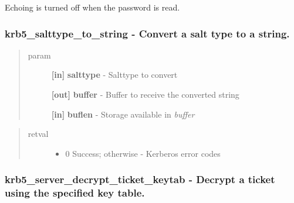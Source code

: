 \documentclass[letterpaper,10pt,english]{sphinxmanual}
\begin{document}
Echoing is turned off when the password is read.


\subsubsection{krb5\_salttype\_to\_string -  Convert a salt type to a string.}
\label{appdev/refs/api/krb5_salttype_to_string::doc}\label{appdev/refs/api/krb5_salttype_to_string:krb5-salttype-to-string-convert-a-salt-type-to-a-string}

\begin{fulllineitems}
\label{appdev/refs/api/krb5_salttype_to_string:krb5_salttype_to_string}
\end{fulllineitems}

\begin{quote}\begin{description}
\item[{param}] \leavevmode
\textbf{{[}in{]}} \textbf{salttype} - Salttype to convert

\textbf{{[}out{]}} \textbf{buffer} - Buffer to receive the converted string

\textbf{{[}in{]}} \textbf{buflen} - Storage available in \emph{buffer}

\end{description}\end{quote}
\begin{quote}\begin{description}
\item[{retval}] \leavevmode\begin{itemize}
\item {} 
0   Success; otherwise - Kerberos error codes

\end{itemize}

\end{description}\end{quote}


\subsubsection{krb5\_server\_decrypt\_ticket\_keytab -  Decrypt a ticket using the specified key table.}
\label{appdev/refs/api/krb5_server_decrypt_ticket_keytab:krb5-server-decrypt-ticket-keytab-decrypt-a-ticket-using-the-specified-key-table}\label{appdev/refs/api/krb5_server_decrypt_ticket_keytab::doc}
\end{document}
